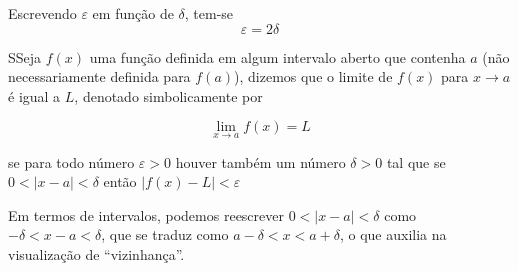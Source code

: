 Escrevendo $\varepsilon$ em função de $\delta$, tem-se
\[\varepsilon = 2\delta\]

\begin{defin}
  SSeja $f(x)$ uma função definida em algum intervalo aberto que contenha $a$ (não necessariamente definida para $f(a)$), dizemos que o limite de $f(x)$ para $x\to a$ é igual a $L$, denotado simbolicamente por

  \begin{equation*}
    \lim_{x\to a} f(x) = L
  \end{equation*}

  se para todo número $\varepsilon > 0$ houver também um número $\delta > 0$ tal que se $0 < |x - a| < \delta$ então $|f(x) - L| < \varepsilon$  
\end{defin}

Em termos de intervalos, podemos reescrever $0 < |x - a| < \delta$ como $-\delta < x - a < \delta$, que se traduz como $a - \delta < x < a + \delta$, o que auxilia na visualização de ``vizinhança''. 



